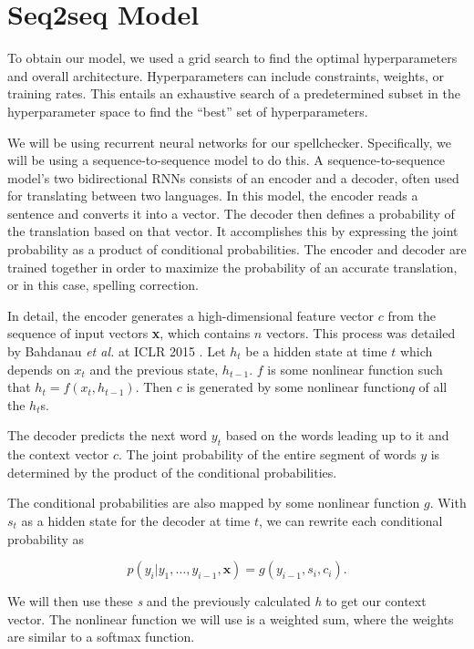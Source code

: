 \documentclass[11pt,a4paper]{scrartcl}
\theoremstyle{definition}
\begin{document}
\section{Seq2seq Model}

To obtain our model, we used a grid search to find the optimal hyperparameters and overall architecture. Hyperparameters can include constraints, weights, or training rates. This entails an exhaustive search of a predetermined subset in the hyperparameter space to find the “best” set of hyperparameters.\newline

We will be using recurrent neural networks for our spellchecker. Specifically, we will be using a sequence-to-sequence model to do this. A sequence-to-sequence model’s two bidirectional RNNs consists of an encoder and a decoder, often used for translating between two languages. 
In this model, the encoder reads a sentence and converts it into a vector. The decoder then defines a probability of the translation based on that vector. It accomplishes this by expressing the joint probability as a product of conditional probabilities. The encoder and decoder are trained together in order to maximize the probability of an accurate translation, or in this case, spelling correction.\newline

In detail, the encoder generates a high-dimensional feature vector $c$ from the sequence of input vectors \textbf{x}, which contains $n$ vectors. This process was detailed by Bahdanau \emph{et al.} at ICLR 2015 \cite{Bahdanau}. Let $h_t$ be a hidden state at time $t$ which depends on $x_t$ and the previous state, $h_{t-1}$. $f$ is some nonlinear function such that $h_t = f(x_t, h_{t-1})$. Then $c$ is generated by some nonlinear function$q$ of all the $h_t$s. \newline

The decoder predicts the next word $y_t$ based on the words leading up to it and the context vector $c$. The joint probability of the entire segment of words $y$ is determined by the product of the conditional probabilities. \newline

The conditional probabilities are also mapped by some nonlinear function $g$. With $s_t$ as a hidden state for the decoder at time $t$, we can rewrite each conditional probability as

\[p(y_i | y_1,\dots,y_{i-1}, \textbf{x}) = g(y_{i-1},s_i,c_i).\]

We will then use these \textit{s} and the previously calculated \textit{h} to get our context vector. The nonlinear function we will use is a weighted sum, where the weights are similar to a softmax function. \newline
\end{document}
